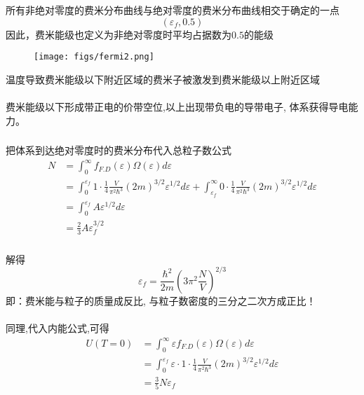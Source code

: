 \begin{frame}
  \frametitle{}
\begin{minipage}[b]{0.49\textwidth}
所有非绝对零度的费米分布曲线与绝对零度的费米分布曲线相交于确定的一点
\[ (\varepsilon_f, 0.5)\]
因此，费米能级也定义为非绝对零度时平均占据数为$0.5$的能级 \\
\end{minipage}
\begin{minipage}[b]{0.49\textwidth}
  \begin{figure}
    \texttt{[image: figs/fermi2.png]}   
\end{figure}
\end{minipage}
温度导致费米能级以下附近区域的费米子被激发到费米能级以上附近区域 \\
~~\\ 
费米能级以下形成带正电的价带空位,以上出现带负电的导带电子, 体系获得导电能力。 
\end{frame} 

\begin{frame}[label=current]
  \frametitle{}
\证 把体系到达绝对零度时的费米分布代入总粒子数公式
\[ 
  \begin{aligned}
  N&= \int_0^\infty f_{F.D}(\varepsilon) \Omega(\varepsilon) d \varepsilon \\ 
  &= \int_0^{\varepsilon _f} 1\cdot \frac{1}{4} \frac{V}{\pi ^2 \hbar^3} (2m)^{3/2} \varepsilon^{1/2} d \varepsilon + \int_{\varepsilon _f}^\infty 0\cdot \frac{1}{4} \frac{V}{\pi ^2 \hbar^3} (2m)^{3/2} \varepsilon^{1/2} d \varepsilon \\
  &= \int_0^{\varepsilon _f} A \varepsilon^{1/2} d \varepsilon \\
  &= \frac{2}{3} A \varepsilon _f^{3/2}
  \end{aligned}\]
\end{frame} 

\begin{frame}[label=current]
  \frametitle{}
解得
\[ \varepsilon _f = \frac{\hbar^2}{2m} \left(3\pi ^2 \frac{N}{V}\right)^{2/3}\]
即：费米能与粒子的质量成反比, 与粒子数密度的三分之二次方成正比！ \\
~~\\ 
同理,代入内能公式,可得
\[ 
  \begin{aligned}
  U(T=0) &= \int_0^\infty \varepsilon f_{F.D}(\varepsilon) \Omega(\varepsilon) d \varepsilon \\ 
  &= \int_0^{\varepsilon _f}  \varepsilon \cdot 1\cdot \frac{1}{4} \frac{V}{\pi ^2 \hbar^3} (2m)^{3/2} \varepsilon^{1/2} d \varepsilon \\
  &= \frac{3}{5} N \varepsilon _f 
  \end{aligned}\]
\end{frame} 

